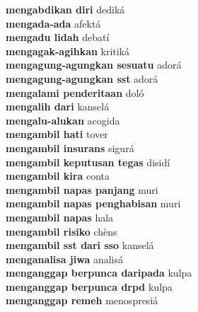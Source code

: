 \textbf{ mengabdikan diri  } dediká \\
\textbf{ mengada-ada  } afektá \\
\textbf{ mengadu lidah  } debatí \\
\textbf{ mengagak-agihkan  } kritiká \\
\textbf{ mengagung-agungkan sesuatu  } adorá \\
\textbf{ mengagung-agungkan sst  } adorá \\
\textbf{ mengalami penderitaan  } doló \\
\textbf{ mengalih dari  } kanselá \\
\textbf{ mengalu-alukan  } acogida \\
\textbf{ mengambil hati  } tover \\
\textbf{ mengambil insurans  } sigurá \\
\textbf{ mengambil keputusan tegas  } disidí \\
\textbf{ mengambil kira  } conta \\
\textbf{ mengambil napas panjang  } muri \\
\textbf{ mengambil napas penghabisan  } muri \\
\textbf{ mengambil napas  } hala \\
\textbf{ mengambil risiko  } chèns \\
\textbf{ mengambil sst dari sso  } kanselá \\
\textbf{ menganalisa jiwa  } analisá \\
\textbf{ menganggap berpunca daripada  } kulpa \\
\textbf{ menganggap berpunca drpd  } kulpa \\
\textbf{ menganggap remeh  } menospresiá \\
